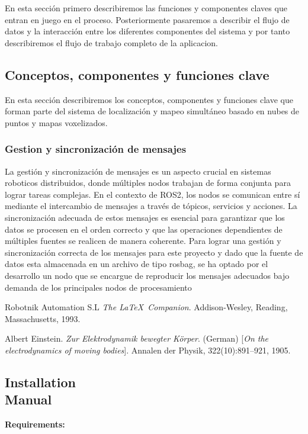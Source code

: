 \documentclass[12pt, a4paper, twoside]{article}
\begin{document}
En esta sección primero describiremos las funciones y componentes claves que entran en juego en el proceso. Posteriormente pasaremos a 
describir el flujo de datos y la interacción entre los diferentes componentes del sistema y por tanto describiremos el flujo de trabajo 
completo de la aplicacion.

\subsection{Conceptos, componentes y funciones clave}
En esta sección describiremos los conceptos, componentes y funciones clave que forman parte del sistema de localización y mapeo
simultáneo basado en nubes de puntos y mapas voxelizados.

\subsubsection{Gestion y sincronización de mensajes}
La gestión y sincronización de mensajes es un aspecto crucial en sistemas roboticos distribuidos, donde múltiples nodos trabajan de forma 
conjunta para lograr tareas complejas. En el contexto de ROS2, los nodos se comunican entre sí mediante el intercambio de mensajes a
través de tópicos, servicios y acciones. La sincronización adecuada de estos mensajes es esencial para garantizar que los datos se procesen 
en el orden correcto y que las operaciones dependientes de múltiples fuentes se realicen de manera coherente. \newline
Para lograr una gestión y sincronización correcta de los mensajes para este proyecto y dado que la fuente de datos esta almacenada en un 
archivo de tipo rosbag, se ha optado por el desarrollo un nodo que se encargue de reproducir los mensajes adecuados bajo demanda de los 
principales nodos de procesamiento

\begin{thebibliography}{9}
    Robotnik Automation S.L
    \textit{The \LaTeX\ Companion}. 
    Addison-Wesley, Reading, Massachusetts, 1993.
    
    Albert Einstein. 
    \textit{Zur Elektrodynamik bewegter K{\"o}rper}. (German) 
    [\textit{On the electrodynamics of moving bodies}]. 
    Annalen der Physik, 322(10):891–921, 1905.
\end{thebibliography}

\newpage

\begin{umaappendices}
\section{Installation \\ Manual}
    
    \textbf{\large{Requirements:}}

\end{umaappendices}
\end{document}
